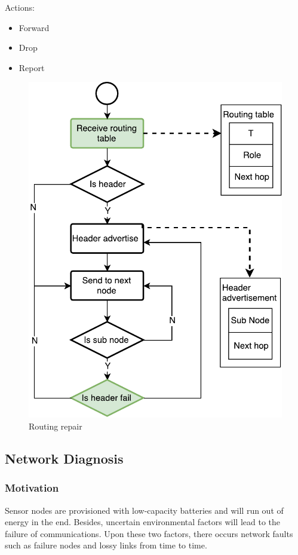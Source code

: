 Actions:
\begin{itemize}
\item	Forward
\item	Drop
\item	Report
\end{itemize}

\begin{figure}[htbp]
	\centering
	\includegraphics[width=.85\columnwidth]{Figure/routing-flow}
	\vspace{-0.1in}
	\caption{Routing repair}
	\label{routing-flow}
	\vspace{-0.2in}
\end{figure}


\subsection{Network Diagnosis}

\subsubsection{Motivation}

Sensor nodes are provisioned with low-capacity batteries and will run out of energy in the end. 
Besides, uncertain environmental factors will lead to the failure of communications.
Upon these two factors, there occurs network faults such as failure nodes and lossy links from time to time.


